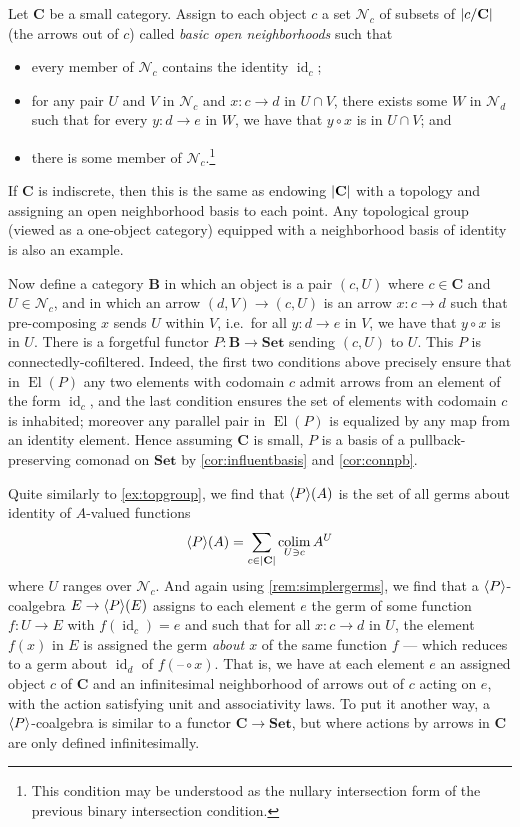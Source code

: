 \documentclass[11pt, oneside, article]{memoir}
\theoremstyle{plain}
\theoremstyle{definition}
\theoremstyle{remark}
\newenvironment{example}
{\renewcommand\qedsymbol{$\lrcorner$}%
  \pushQED{\qed}\myexample}
{\popQED\endmyexample}
\DeclareMathOperator{\id}{id}
\DeclareMathOperator{\El}{El}
\DeclareMathOperator*{\colim}{colim}
\DeclarePairedDelimiter{\gen}{\langle}{\rangle}
\DeclarePairedDelimiter{\abs}{\lvert}{\rvert}
\newcommand{\dash}{{\mathord{\text{--}}}}
\newcommand{\namedcat}[1]{\mathbf{#1}}
\newcommand{\cat}[1]{\mathbf{#1}}
\newcommand{\Set}{\namedcat{Set}}
\newcommand{\pts}[1]{{\abs{#1}}}
\newcommand{\obs}[1]{\pts{#1}}
\newcommand{\ph}[1]{#1}
\newcommand{\eE}{E}
\newcommand{\xA}{A}
\newcommand{\bB}{\cat{B}}
\newcommand{\bC}{\cat{C}}
\newcommand{\pP}{\ph{P}}
\newcommand{\cP}{\gen{\pP}}
\newcommand{\neighbors}[1]{\mathcal{N}_{#1}}
\begin{document}
\begin{example}[Infinitesimal categories]\label{ex:topcat}
  Let $\bC$ be a small category. Assign to each object $c$ a set
  $\neighbors{c}$ of subsets of $\pts{c/\bC}$ (the arrows out of $c$)
  called \emph{basic open neighborhoods} such that
  \begin{itemize}
  \item every member of $\neighbors{c}$ contains the identity $\id_c$;
  \item for any pair $U$ and $V$ in $\neighbors{c}$ and
    $x \colon c \to d$ in $U \cap V$, there exists some $W$ in
    $\neighbors{d}$ such that for every $y \colon d \to e$ in $W$, we
    have that $y \circ x$ is in $U \cap V$; and
  \item there is some member of $\neighbors{c}$.\footnote{This
      condition may be understood as the nullary intersection form of
      the previous binary intersection condition.}
  \end{itemize}
  If $\bC$ is indiscrete, then this is the same as endowing
  $\pts{\bC}$ with a topology and assigning an open neighborhood basis
  to each point. Any topological group (viewed as a one-object
  category) equipped with a neighborhood basis of identity is also an
  example.

  Now define a category $\bB$ in which an object is a pair $(c, U)$
  where $c \in \bC$ and $U \in \neighbors{c}$, and in which an arrow
  $(d, V) \to (c, U)$ is an arrow $x \colon c \to d$ such that
  pre-composing $x$ sends $U$ within $V$, i.e.\ for all $y \colon d \to e$
  in $V$, we have that $y \circ x$ is in $U$. There is a forgetful
  functor $\pP \colon \bB \to \Set$ sending $(c, U)$ to $U$. This
  $\pP$ is connectedly-cofiltered. Indeed, the first two conditions
  above precisely ensure that in $\El(\pP)$ any two elements with
  codomain $c$ admit arrows from an element of the form $\id_c$, and
  the last condition ensures the set of elements with codomain $c$ is
  inhabited; moreover any parallel pair in $\El(\pP)$ is equalized by
  any map from an identity element. Hence assuming $\bC$ is small,
  $\pP$ is a basis of a pullback-preserving comonad on $\Set$ by
  \cref{cor:influentbasis} and \cref{cor:connpb}.

  Quite similarly to \cref{ex:topgroup}, we find that $\cP(\xA)$ is
  the set of all germs about identity of $\xA$-valued functions
  \[\cP(\xA) = \sum_{c\in \obs{\bC}} \colim_{U \ni c} \xA^U\]
  where $U$ ranges over $\neighbors{c}$. And again using
  \cref{rem:simplergerms}, we find that a $\cP$-coalgebra
  $\eE \to \cP(\eE)$ assigns to each element $e$ the germ of some
  function $f \colon U \to \eE$ with $f(\id_c) = e$ and such that for
  all $x \colon c \to d$ in $U$, the element $f(x)$ in $\eE$ is
  assigned the germ \emph{about $x$} of the same function $f$ ---
  which reduces to a germ about $\id_d$ of $f(\dash \circ x)$. That
  is, we have at each element $e$ an assigned object $c$ of $\bC$ and an
  infinitesimal neighborhood of arrows out of $c$ acting on $e$, with
  the action satisfying unit and associativity laws. To put it another
  way, a $\cP$-coalgebra is similar to a functor $\bC \to \Set$, but
  where actions by arrows in $\bC$ are only defined infinitesimally.
  

\end{example}
\end{document}

